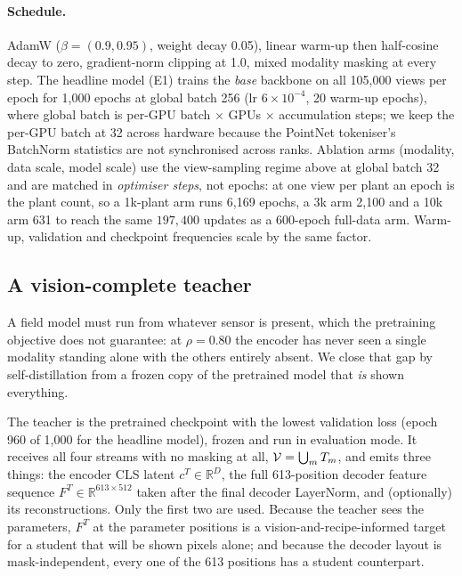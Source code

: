 \paragraph{Schedule.}
AdamW ($\beta{=}(0.9,0.95)$, weight decay 0.05), linear warm-up then half-cosine
decay to zero, gradient-norm clipping at 1.0, mixed modality masking at every step.
The headline model (E1) trains the \emph{base} backbone on all 105{,}000 views per
epoch for 1{,}000 epochs at global batch 256 (lr $6\times10^{-4}$, 20 warm-up
epochs), where global batch is per-GPU batch $\times$ GPUs $\times$ accumulation
steps; we keep the per-GPU batch at 32 across hardware because the PointNet
tokeniser's BatchNorm statistics are not synchronised across ranks. Ablation arms
(modality, data scale, model scale) use the view-sampling regime above at global
batch 32 and are matched in \emph{optimiser steps}, not epochs: at one view per
plant an epoch is the plant count, so a 1k-plant arm runs 6{,}169 epochs, a 3k arm
2{,}100 and a 10k arm 631 to reach the same $197{,}400$ updates as a 600-epoch
full-data arm. Warm-up, validation and checkpoint frequencies scale by the same
factor.

\subsection{A vision-complete teacher}
\label{sec:distill}

A field model must run from whatever sensor is present, which the pretraining
objective does not guarantee: at $\rho{=}0.80$ the encoder has never seen a single
modality standing alone with the others entirely absent. We close that gap by
self-distillation from a frozen copy of the pretrained model that \emph{is} shown
everything.

The teacher is the pretrained checkpoint with the lowest validation loss (epoch
960 of 1{,}000 for the headline model), frozen and run in evaluation mode. It
receives all four streams with no masking at all, $\mathcal{V}=\bigcup_m T_m$, and emits
three things: the encoder CLS latent $c^{T}\in\mathbb{R}^{D}$, the full
613-position decoder feature sequence $F^{T}\in\mathbb{R}^{613\times512}$ taken
after the final decoder LayerNorm, and (optionally) its reconstructions. Only the
first two are used. Because the teacher sees the parameters, $F^{T}$ at the
parameter positions is a vision-and-recipe-informed target for a student that will
be shown pixels alone; and because the decoder layout is mask-independent, every
one of the 613 positions has a student counterpart.


